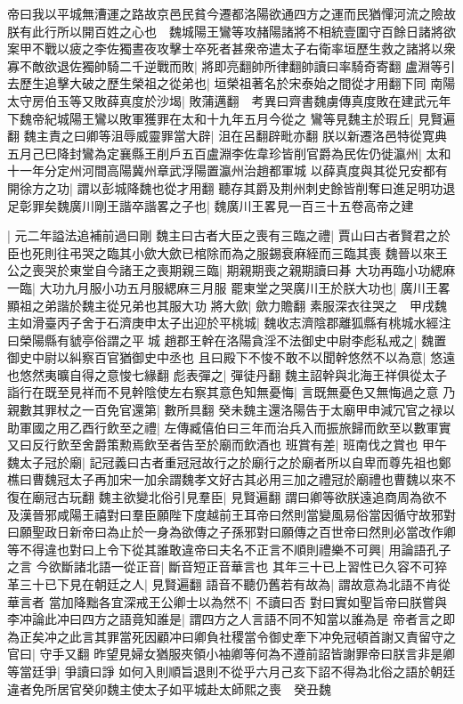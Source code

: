 帝曰我以平城無漕運之路故京邑民貧今遷都洛陽欲通四方之運而民猶憚河流之險故朕有此行所以開百姓之心也　魏城陽王鸞等攻赭陽諸將不相統壹圍守百餘日諸將欲案甲不戰以疲之李佐獨晝夜攻擊士卒死者甚衆帝遣太子右衛率垣歷生救之諸將以衆寡不敵欲退佐獨帥騎二千逆戰而敗|{
	將即亮翻帥所律翻帥讀曰率騎奇寄翻}
盧淵等引去歷生追擊大破之歷生榮祖之從弟也|{
	垣榮祖著名於宋泰始之間從才用翻下同}
南陽太守房伯玉等又敗薛真度於沙堨|{
	敗蒲邁翻　考異曰齊書魏虜傳真度敗在建武元年下魏帝紀城陽王鸞以敗軍獲罪在太和十九年五月今從之}
鸞等見魏主於瑕丘|{
	見賢遍翻}
魏主責之曰卿等沮辱威靈罪當大辟|{
	沮在呂翻辟毗亦翻}
朕以新遷洛邑特從寛典五月己巳降封鸞為定襄縣王削戶五百盧淵李佐韋珍皆削官爵為民佐仍徙瀛州|{
	太和十一年分定州河間高陽冀州章武浮陽置瀛州治趙都軍城}
以薛真度與其從兄安都有開徐方之功|{
	謂以彭城降魏也從才用翻}
聽存其爵及荆州刺史餘皆削奪曰進足明功退足彰罪矣魏廣川剛王諧卒諧畧之子也|{
	魏廣川王畧見一百三十五卷高帝之建}


|{
	元二年謚法追補前過曰剛}
魏主曰古者大臣之喪有三臨之禮|{
	賈山曰古者賢君之於臣也死則往弔哭之臨其小歛大歛已棺除而為之服錫衰麻絰而三臨其喪}
魏晉以來王公之喪哭於東堂自今諸王之喪期親三臨|{
	期親期喪之親期讀曰朞}
大功再臨小功緦麻一臨|{
	大功九月服小功五月服緦麻三月服}
罷東堂之哭廣川王於朕大功也|{
	廣川王畧顯祖之弟諧於魏主從兄弟也其服大功}
將大歛|{
	歛力贍翻}
素服深衣往哭之　甲戌魏主如滑臺丙子舍于石濟庚申太子出迎於平桃城|{
	魏收志濟陰郡離狐縣有桃城水經注曰榮陽縣有䝞亭俗謂之平城}
趙郡王幹在洛陽貪淫不法御史中尉李彪私戒之|{
	魏置御史中尉以糾察百官猶御史中丞也}
且曰殿下不悛不敢不以聞幹悠然不以為意|{
	悠遠也悠然夷曠自得之意悛七緣翻}
彪表彈之|{
	彈徒丹翻}
魏主詔幹與北海王祥俱從太子詣行在既至見祥而不見幹陰使左右察其意色知無憂悔|{
	言既無憂色又無悔過之意}
乃親數其罪杖之一百免官還第|{
	數所具翻}
癸未魏主還洛陽告于太廟甲申減冗官之禄以助軍國之用乙酉行飲至之禮|{
	左傳臧僖伯曰三年而治兵入而振旅歸而飲至以數軍實又曰反行飲至舍爵策勲焉飲至者告至於廟而飲酒也}
班賞有差|{
	班南伐之賞也}
甲午魏太子冠於廟|{
	記冠義曰古者重冠冠故行之於廟行之於廟者所以自卑而尊先祖也鄭樵曰曹魏冠太子再加宋一加余謂魏孝文好古其必用三加之禮冠於廟禮也曹魏以來不復在廟冠古玩翻}
魏主欲變北俗引見羣臣|{
	見賢遍翻}
謂曰卿等欲朕遠追商周為欲不及漢晉邪咸陽王禧對曰羣臣願陛下度越前王耳帝曰然則當變風易俗當因循守故邪對曰願聖政日新帝曰為止於一身為欲傳之子孫邪對曰願傳之百世帝曰然則必當改作卿等不得違也對曰上令下從其誰敢違帝曰夫名不正言不順則禮樂不可興|{
	用論語孔子之言}
今欲斷諸北語一從正音|{
	斷音短正音華言也}
其年三十已上習性已久容不可猝革三十已下見在朝廷之人|{
	見賢遍翻}
語音不聽仍舊若有故為|{
	謂故意為北語不肯從華言者}
當加降黜各宜深戒王公卿士以為然不|{
	不讀曰否}
對曰實如聖旨帝曰朕嘗與李冲論此冲曰四方之語竟知誰是|{
	謂四方之人言語不同不知當以誰為是}
帝者言之即為正矣冲之此言其罪當死因顧冲曰卿負社稷當令御史牽下冲免冠頓首謝又責留守之官曰|{
	守手又翻}
昨望見婦女猶服夾領小袖卿等何為不遵前詔皆謝罪帝曰朕言非是卿等當廷爭|{
	爭讀曰諍}
如何入則順旨退則不從乎六月己亥下詔不得為北俗之語於朝廷違者免所居官癸卯魏主使太子如平城赴太師熙之喪　癸丑魏

